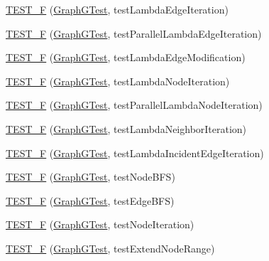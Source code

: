 \begin{DoxyCompactItemize}
\item 
\hyperlink{namespace_ensemble_clustering_adb9341d9e87798d3f4d3128a184d7b88}{T\-E\-S\-T\-\_\-\-F} (\hyperlink{class_ensemble_clustering_1_1_graph_g_test}{Graph\-G\-Test}, test\-Lambda\-Edge\-Iteration)
\item 
\hyperlink{namespace_ensemble_clustering_a410d9a089cf6a393207fc8ab50d1ee22}{T\-E\-S\-T\-\_\-\-F} (\hyperlink{class_ensemble_clustering_1_1_graph_g_test}{Graph\-G\-Test}, test\-Parallel\-Lambda\-Edge\-Iteration)
\item 
\hyperlink{namespace_ensemble_clustering_a2edf5307511dcbc4f4843fab4947e62d}{T\-E\-S\-T\-\_\-\-F} (\hyperlink{class_ensemble_clustering_1_1_graph_g_test}{Graph\-G\-Test}, test\-Lambda\-Edge\-Modification)
\item 
\hyperlink{namespace_ensemble_clustering_ab06e68b15d0f2a2685242e0b694e820c}{T\-E\-S\-T\-\_\-\-F} (\hyperlink{class_ensemble_clustering_1_1_graph_g_test}{Graph\-G\-Test}, test\-Lambda\-Node\-Iteration)
\item 
\hyperlink{namespace_ensemble_clustering_aa8cd6e62333886a702e4dd2857d2e613}{T\-E\-S\-T\-\_\-\-F} (\hyperlink{class_ensemble_clustering_1_1_graph_g_test}{Graph\-G\-Test}, test\-Parallel\-Lambda\-Node\-Iteration)
\item 
\hyperlink{namespace_ensemble_clustering_a3b45694c2974faf2cf514ba03c31a36a}{T\-E\-S\-T\-\_\-\-F} (\hyperlink{class_ensemble_clustering_1_1_graph_g_test}{Graph\-G\-Test}, test\-Lambda\-Neighbor\-Iteration)
\item 
\hyperlink{namespace_ensemble_clustering_a52e6c2b92e9bb1eb286cfcc905f1f95d}{T\-E\-S\-T\-\_\-\-F} (\hyperlink{class_ensemble_clustering_1_1_graph_g_test}{Graph\-G\-Test}, test\-Lambda\-Incident\-Edge\-Iteration)
\item 
\hyperlink{namespace_ensemble_clustering_af76a89dc988a4de215ee5fa89a594890}{T\-E\-S\-T\-\_\-\-F} (\hyperlink{class_ensemble_clustering_1_1_graph_g_test}{Graph\-G\-Test}, test\-Node\-B\-F\-S)
\item 
\hyperlink{namespace_ensemble_clustering_ab928c9a4afab3c2da4d747ae88527185}{T\-E\-S\-T\-\_\-\-F} (\hyperlink{class_ensemble_clustering_1_1_graph_g_test}{Graph\-G\-Test}, test\-Edge\-B\-F\-S)
\item 
\hyperlink{namespace_ensemble_clustering_ac4a9676c50db5fcc17d2a4a80e17b034}{T\-E\-S\-T\-\_\-\-F} (\hyperlink{class_ensemble_clustering_1_1_graph_g_test}{Graph\-G\-Test}, test\-Node\-Iteration)
\item 
\hyperlink{namespace_ensemble_clustering_a8e8f78faab987c3a56ed920f4d9a7183}{T\-E\-S\-T\-\_\-\-F} (\hyperlink{class_ensemble_clustering_1_1_graph_g_test}{Graph\-G\-Test}, test\-Extend\-Node\-Range)

\end{DoxyCompactItemize}
